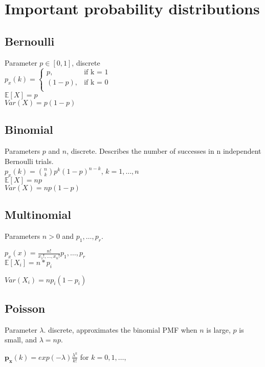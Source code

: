 \section{Important probability distributions}
\subsection*{Bernoulli}
Parameter $p \in[0,1]$, discrete\\
$ p_x(k)=
	\begin{cases}
		 p,&\text{if k = 1}\\
		(1-p),&\text{if k = 0}\\
	\end{cases}
$\\
$\mathbb{E}[X]=p$\\
$Var(X)=p(1-p)$\\

\subsection*{Binomial}
Parameters $p$ and $n$, discrete. Describes the number of successes
in n independent Bernoulli trials.\\

$p_x(k)= {n\choose k}{p}^{k} \left( 1-p \right) ^{n-k}$, $k=1,\ldots, n$\\

$\mathbb{E}[X]=np$\\

$Var(X)= np(1-p)$

\subsection*{Multinomial}

Parameters $n>0$ and $p_1, \ldots, p_r$.

$p_x(x)= \frac{n!}{x_1!,\ldots,x_n!} p_1, \ldots, p_r$\\


$\mathbb{E}[X_i]=n*p_i$

$Var(X_i)=np_i(1-p_i)$


\subsection*{Poisson}
Parameter $\lambda$. discrete, approximates the binomial PMF when $n$ is large, $p$ is small, and $\lambda = np$.

$\mathbf{p_x}(k)=exp(-\lambda)\frac{\lambda^k}{k!}$ for $k=0,1, \ldots,$\\


